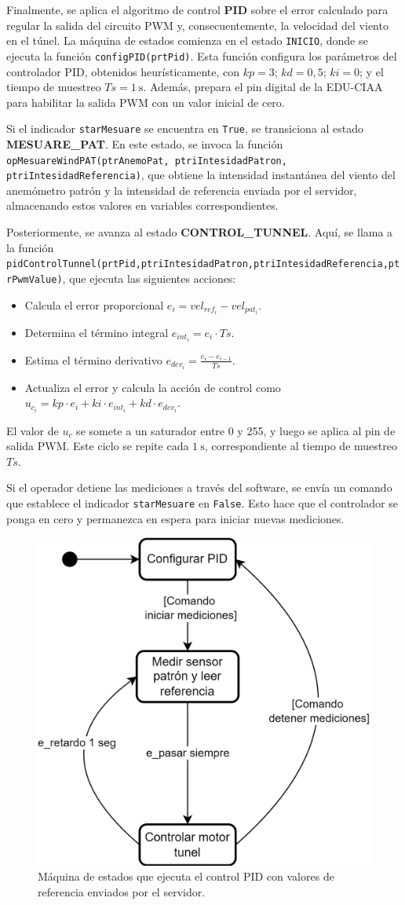 Finalmente, se aplica el algoritmo de control \textbf{PID} sobre el error calculado para regular la salida del circuito PWM y, consecuentemente, la velocidad del viento en el túnel. La máquina de estados comienza en el estado \texttt{INICIO}, donde se ejecuta la función \texttt{configPID(prtPid)}. Esta función configura los parámetros del controlador PID, obtenidos heurísticamente, con $kp = 3$; $kd = 0,5$; $ki = 0$; y el tiempo de muestreo $Ts = \SI{1}{\second}$. Además, prepara el pin digital de la EDU-CIAA para habilitar la salida PWM con un valor inicial de cero.

Si el indicador \texttt{starMesuare} se encuentra en \texttt{True}, se transiciona al estado \textbf{MESUARE\_PAT}. En este estado, se invoca la función \texttt{opMesuareWindPAT(ptrAnemoPat, ptriIntesidadPatron, ptriIntesidadReferencia)}, que obtiene la intensidad instantánea del viento del anemómetro patrón y la intensidad de referencia enviada por el servidor, almacenando estos valores en variables correspondientes.

Posteriormente, se avanza al estado \textbf{CONTROL\_TUNNEL}. Aquí, se llama a la función \texttt{pidControlTunnel(prtPid,ptriIntesidadPatron,ptriIntesidadReferencia,ptrPwmValue)}, que ejecuta las siguientes acciones:
\begin{itemize}
    \item Calcula el error proporcional $e_{i} = vel_{ref_{i}} - vel_{pat_{i}}$.
    \item Determina el término integral $e_{int_{i}} = e_{i} \cdot Ts$.
    \item Estima el término derivativo $e_{dev_{i}} = \frac{e_{i} - e_{i-1}}{Ts}$.
    \item Actualiza el error y calcula la acción de control como $u_{c_{i}} = kp \cdot e_{i} + ki \cdot e_{int_{i}} + kd \cdot e_{dev_{i}}$.
\end{itemize}
El valor de $u_{c}$ se somete a un saturador entre 0 y 255, y luego se aplica al pin de salida PWM. Este ciclo se repite cada $\SI{1}{\second}$, correspondiente al tiempo de muestreo $Ts$.

Si el operador detiene las mediciones a través del software, se envía un comando que establece el indicador \texttt{starMesuare} en \texttt{False}. Esto hace que el controlador se ponga en cero y permanezca en espera para iniciar nuevas mediciones.

\begin{figure}[H]
    \centering
    \includegraphics[width=0.6\linewidth]{Figuras/datalogger/Firmware/sc_controlTunnel.png}
    \caption{Máquina de estados que ejecuta el control PID con valores de referencia enviados por el servidor.}
    \label{fig:pidControlTunel}
\end{figure}
